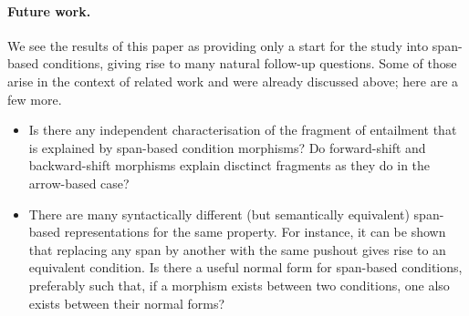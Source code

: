 \paragraph{Future work.}

We see the results of this paper as providing only a start for the study into span-based conditions, giving rise to many natural follow-up questions. Some of those arise in the context of related work and were already discussed above; here are a few more.
%
\begin{itemize}
\item Is there any independent characterisation of the fragment of entailment that is explained by span-based condition morphisms? Do forward-shift and backward-shift morphisms explain disctinct fragments as they do in the arrow-based case?

\item There are many syntactically different (but semantically equivalent) span-based representations for the same property. For instance, it can be shown that replacing any span by another with the same pushout gives rise to an equivalent condition. Is there a useful normal form for span-based conditions, preferably such that, if a morphism exists between two conditions, one also exists between their normal forms?
%
\end{itemize}
